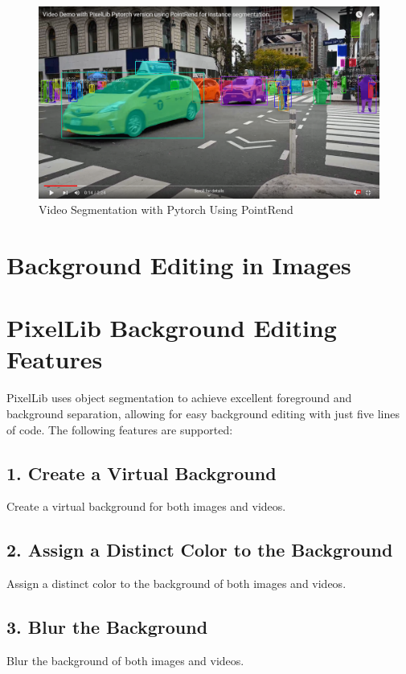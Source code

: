 \begin{figure}[h]
    \centering
    \includegraphics[width=0.8\linewidth]{Images/PixelLib/vid1.png} %
    
    \caption{Video Segmentation with Pytorch Using PointRend}
    \label{fig:your_image_label}
\end{figure}

\section{Background Editing in Images}




\section*{PixelLib Background Editing Features}

PixelLib uses object segmentation to achieve excellent foreground and background separation, allowing for easy background editing with just five lines of code. The following features are supported:

\subsection*{1. Create a Virtual Background}
Create a virtual background for both images and videos.

\subsection*{2. Assign a Distinct Color to the Background}
Assign a distinct color to the background of both images and videos.

\subsection*{3. Blur the Background}
Blur the background of both images and videos.


